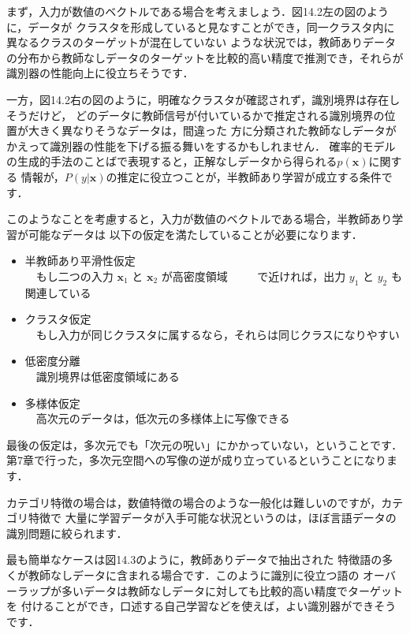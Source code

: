 まず，入力が数値のベクトルである場合を考えましょう．図14.2左の図のように，データが
クラスタを形成していると見なすことができ，同一クラスタ内に異なるクラスのターゲットが混在していない
ような状況では，教師ありデータの分布から教師なしデータのターゲットを比較的高い精度で推測でき，それらが
識別器の性能向上に役立ちそうです．


一方，図14.2右の図のように，明確なクラスタが確認されず，識別境界は存在しそうだけど，
どのデータに教師信号が付いているかで推定される識別境界の位置が大きく異なりそうなデータは，間違った
方に分類された教師なしデータがかえって識別器の性能を下げる振る舞いをするかもしれません．
確率的モデルの生成的手法のことばで表現すると，正解なしデータから得られる$p(\bm{x})$に関する
情報が，$P(y|\bm{x})$の推定に役立つことが，半教師あり学習が成立する条件です．



このようなことを考慮すると，入力が数値のベクトルである場合，半教師あり学習が可能なデータは
以下の仮定を満たしていることが必要になります．

\begin{itemize}
\item 半教師あり平滑性仮定\\
　もし二つの入力 $\bm{x}_1$ と $\bm{x}_2$ が高密度領域
　
　で近ければ，出力 $y_1$ と $y_2$ も関連している
\item クラスタ仮定\\
　もし入力が同じクラスタに属するなら，それらは同じクラスになりやすい
\item 低密度分離\\
　識別境界は低密度領域にある
\item 多様体仮定\\
　高次元のデータは，低次元の多様体上に写像できる
\end{itemize}

最後の仮定は，多次元でも「次元の呪い」にかかっていない，ということです．
第7章で行った，多次元空間への写像の逆が成り立っているということになります．



カテゴリ特徴の場合は，数値特徴の場合のような一般化は難しいのですが，カテゴリ特徴で
大量に学習データが入手可能な状況というのは，ほぼ言語データの識別問題に絞られます．

最も簡単なケースは図14.3のように，教師ありデータで抽出された
特徴語の多くが教師なしデータに含まれる場合です．このように識別に役立つ語の
オーバーラップが多いデータは教師なしデータに対しても比較的高い精度でターゲットを
付けることができ，口述する自己学習などを使えば，よい識別器ができそうです．

